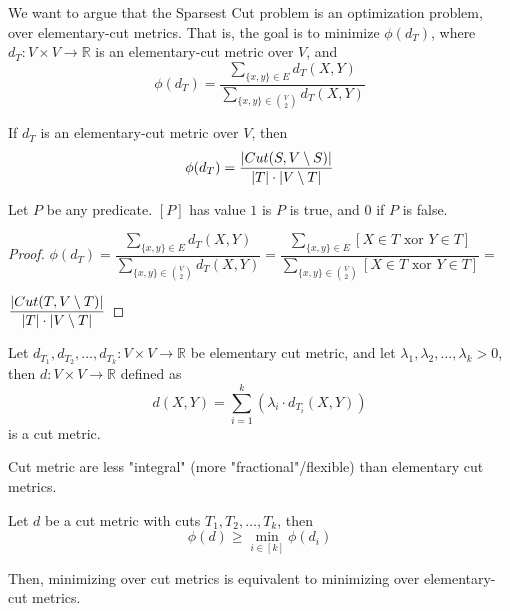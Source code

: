     We want to argue that the Sparsest Cut problem is an optimization problem, over elementary-cut metrics.
    That is, the goal is to minimize $\phi(d_T)$, where $d_T : V \times V \rightarrow \mathbb{R}$ is an elementary-cut metric over $V$, and
    \[ \phi(d_T) = \dfrac{\sum_{\{x,y\} \in E} d_T(X,Y)}{\sum_{\{x,y\} \in \binom{V}{2}} d_T(X,Y)} \]

    \begin{lemma}\label{lemma:metric2}
        If $d_T$ is an elementary-cut metric over $V$, then
        \[ \phi(d_T) = \dfrac{\vert Cut(S, V \setminus S) \vert}{\vert T \vert \cdot \vert V \setminus T \vert} \]
    \end{lemma}

    Let $P$ be any predicate. $[P]$ has value $1$ is $P$ is true, and $0$ if $P$ is false.

    \begin{proof}
        $\phi(d_T) =
        \dfrac{\sum_{\{x,y\} \in E} d_T(X,Y)}{\sum_{\{x,y\} \in \binom{V}{2}} d_T(X,Y)} = 
        \dfrac{\sum_{\{x,y\} \in E} [X \in T \text{ xor } Y \in T]}{\sum_{\{x,y\} \in \binom{V}{2}} [X \in T \text{ xor } Y \in T]} = $

        $\dfrac{\vert Cut(T, V \setminus T) \vert}{\vert T \vert \cdot \vert V \setminus T \vert}$
    \end{proof}

    \begin{definition}
        Let $d_{T_1}, d_{T_2}, \dots, d_{T_k} : V \times V \rightarrow \mathbb{R}$ be elementary cut metric, and let $\lambda_1, \lambda_2, \dots, \lambda_k > 0$, then $d : V \times V \rightarrow \mathbb{R}$ defined as
        \[ d(X,Y) = \sum_{i=1}^{k}(\lambda_i \cdot d_{T_i}(X,Y)) \]
        is a cut metric.
    \end{definition}

    Cut metric are less "integral" (more "fractional"/flexible) than elementary cut metrics.

    \begin{lemma}\label{lemma:metric3}
        Let $d$ be a cut metric with cuts $T_1, T_2, \dots, T_k$, then
        \[ \phi(d) \geq \min_{i \in [k]} \phi(d_i) \]
    \end{lemma}

    Then, minimizing over cut metrics is equivalent to minimizing over elementary-cut metrics.

